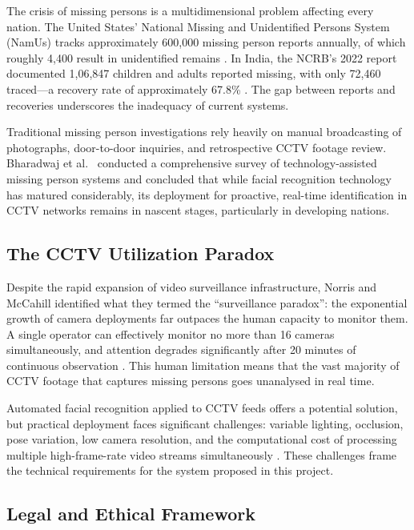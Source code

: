 \documentclass[12pt, a4paper]{article}
\begin{document}
The crisis of missing persons is a multidimensional problem affecting every nation. The United States' National Missing and Unidentified Persons System (NamUs) tracks approximately 600,000 missing person reports annually, of which roughly 4,400 result in unidentified remains \cite{namus2023}. In India, the NCRB's 2022 report documented 1,06,847 children and adults reported missing, with only 72,460 traced---a recovery rate of approximately 67.8\% \cite{ncrb2023}. The gap between reports and recoveries underscores the inadequacy of current systems.

Traditional missing person investigations rely heavily on manual broadcasting of photographs, door-to-door inquiries, and retrospective CCTV footage review. Bharadwaj et al.\ \cite{bharadwaj2021} conducted a comprehensive survey of technology-assisted missing person systems and concluded that while facial recognition technology has matured considerably, its deployment for proactive, real-time identification in CCTV networks remains in nascent stages, particularly in developing nations.

\subsection{The CCTV Utilization Paradox}

Despite the rapid expansion of video surveillance infrastructure, Norris and McCahill \cite{norris2006} identified what they termed the ``surveillance paradox'': the exponential growth of camera deployments far outpaces the human capacity to monitor them. A single operator can effectively monitor no more than 16 cameras simultaneously, and attention degrades significantly after 20 minutes of continuous observation \cite{keval2010}. This human limitation means that the vast majority of CCTV footage that captures missing persons goes unanalysed in real time.

Automated facial recognition applied to CCTV feeds offers a potential solution, but practical deployment faces significant challenges: variable lighting, occlusion, pose variation, low camera resolution, and the computational cost of processing multiple high-frame-rate video streams simultaneously \cite{adjabi2020}. These challenges frame the technical requirements for the system proposed in this project.

\subsection{Legal and Ethical Framework}
\end{document}
